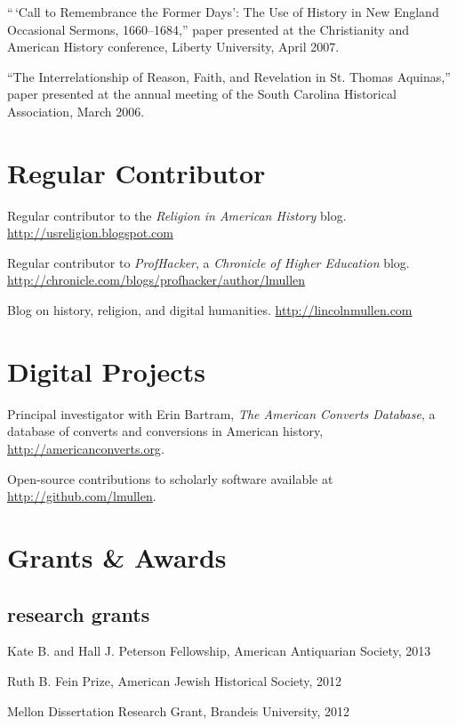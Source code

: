 \documentclass[11pt]{article}
\begin{document}
``\,`Call to Remembrance the Former Days': The Use of History in New
England Occasional Sermons, 1660--1684,'' paper presented at the
Christianity and American History conference, Liberty University, April
2007.

``The Interrelationship of Reason, Faith, and Revelation in St. Thomas
Aquinas,'' paper presented at the annual meeting of the South Carolina
Historical Association, March 2006.

\section{Regular Contributor}

Regular contributor to the \emph{Religion in American History} blog. 
\href{http://usreligion.blogspot.com}{http://usreligion.blogspot.com}

Regular contributor to \emph{ProfHacker}, a \emph{Chronicle of Higher
Education} blog.
\url{http://chronicle.com/blogs/profhacker/author/lmullen}

Blog on history, religion, and digital humanities.
\url{http://lincolnmullen.com}

\section{Digital Projects}

Principal investigator with Erin Bartram, \emph{The American Converts 
Database}, a database of converts and conversions in American history, 
\href{http://americanconverts.org}{http://americanconverts.org}.

Open-source contributions to scholarly software available at 
\href{http://github.com/lmullen}{http://github.com/lmullen}.

\section{Grants \& Awards}

\subsection{research grants}

Kate B. and Hall J. Peterson Fellowship, American Antiquarian Society, 2013

Ruth B. Fein Prize, American Jewish Historical Society, 2012

Mellon Dissertation Research Grant, Brandeis University, 2012
\end{document}
